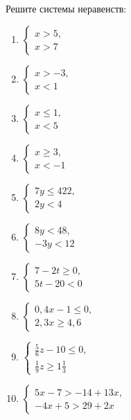 \documentclass[algebra,twocolumn]{pum}
\renewcommand\le\leqslant
\renewcommand\ge\geqslant
\begin{document}
\begin{exercises}
  \begin{question}
  Решите системы неравенств:
  \begin{multicols}{2}
    \begin{enumerate}[label=\arabic*),nosep]
      \item $\begin{cases} x>5,\\x>7 \end{cases}$
      \item $\begin{cases} x>-3,\\x<1 \end{cases}$
      \item $\begin{cases} x\le1,\\x<5 \end{cases}$
      \item $\begin{cases} x\ge3,\\x<-1 \end{cases}$
      \item $\begin{cases} 7y\le422,\\2y<4 \end{cases}$
      \item $\begin{cases} 8y<48,\\-3y<12 \end{cases}$
      \item $\begin{cases} 7-2t\ge0,\\5t-20<0 \end{cases}$
      \item $\begin{cases} 0,4x-1\le0,\\2,3x\ge4,6 \end{cases}$
      \item $\begin{cases} \frac{5}{6}z-10\le0,\\ \frac{1}{9}z\ge1\frac{1}{3} \end{cases}$
      \item $\begin{cases} 5x-7>-14+13x,\\ -4x+5>29+2x \end{cases}$
    \end{enumerate}
  \end{multicols}

\end{question}
\end{exercises}
\end{document}
